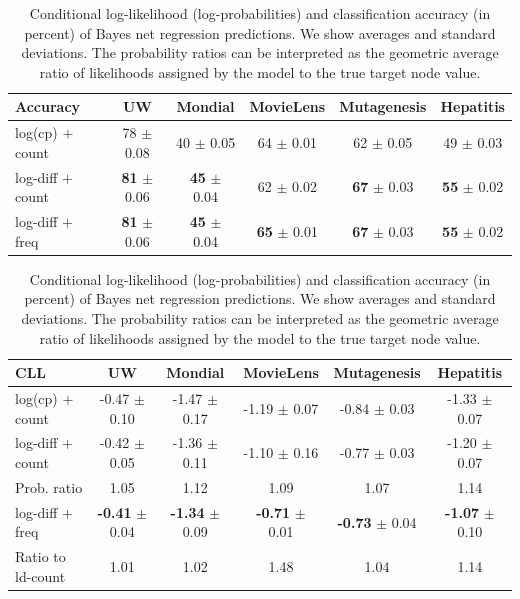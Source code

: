 \documentclass[twoside,11pt]{article}
\begin{document}
 
\begin{table}[thbp]
\caption{Conditional log-likelihood (log-probabilities) and classification accuracy (in percent) of Bayes net regression predictions. We show averages and standard deviations. The probability ratios can be interpreted as the geometric average ratio of likelihoods assigned by the model to the true target node value.}


\begin{center}
\begin{tabular}{|l|c|c|c|c|c|}
\hline
Accuracy& UW & Mondial & MovieLens & Mutagenesis & Hepatitis \\\hline
log(cp) $+$ count & 78 $\pm$ 0.08 & 40 $\pm$ 0.05 & 64 $\pm$ 0.01 & 62 $\pm$ 0.05 & 49 $\pm$ 0.03 \\
log-diff $+$ count & \textbf{81} $\pm$ 0.06 & \textbf{45} $\pm$ 0.04 & 62 $\pm$ 0.02 & \textbf{67} $\pm$ 0.03 & \textbf{55} $\pm$ 0.02 \\
log-diff $+$ freq & \textbf{81} $\pm$ 0.06 & \textbf{45} $\pm$ 0.04 & \textbf{65} $\pm$ 0.01 & \textbf{67} $\pm$ 0.03 & \textbf{55} $\pm$ 0.02 \\
\hline
\end{tabular}
\end{center}

\begin{center}
\begin{tabular}{|l|c|c|c|c|c|}
\hline
CLL & UW & Mondial & MovieLens & Mutagenesis & Hepatitis \\\hline
log(cp) $+$ count & -0.47 $\pm$ 0.10 & -1.47 $\pm$ 0.17 & -1.19 $\pm$ 0.07 & -0.84 $\pm$ 0.03 & -1.33 $\pm$ 0.07 \\
log-diff $+$ count & -0.42 $\pm$ 0.05 & -1.36 $\pm$ 0.11 & -1.10 $\pm$ 0.16 & -0.77 $\pm$ 0.03 & -1.20 $\pm$ 0.07\\
Prob. ratio & 1.05 & 1.12 & 1.09 & 1.07 & 1.14\\\hline
log-diff $+$ freq & \textbf{-0.41} $\pm$ 0.04 & \textbf{-1.34} $\pm$ 0.09 & \textbf{-0.71} $\pm$ 0.01 & \textbf{-0.73} $\pm$ 0.04 & \textbf{-1.07} $\pm$ 0.10\\
Ratio to ld-count & 1.01 & 1.02 & 1.48 & 1.04 & 1.14\\
\hline
\end{tabular}
\end{center}
\label{table:bn}
\end{table}%
\end{document}
